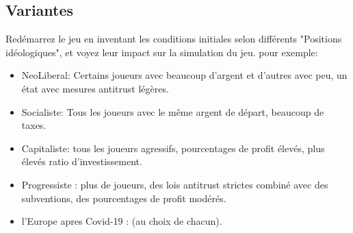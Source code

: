 \documentclass[12pt]{article}
\begin{document}
\subsection{Variantes}
Redémarrez le jeu en inventant les conditions initiales selon différents
"Positions idéologiques", et voyez leur impact sur la simulation du jeu. pour
exemple:
\begin{itemize}
  \item NeoLiberal: Certains joueurs avec beaucoup d'argent et d'autres avec peu, un état avec
mesures antitrust légères.
  \item Socialiste: Tous les joueurs avec le même argent de départ, beaucoup de taxes.
  \item Capitaliste: tous les joueurs agressifs, pourcentages de profit élevés, plus élevés
ratio d'investissement.
  \item Progressiste : plus de joueurs, des lois antitrust strictes
combiné avec des subventions, des pourcentages de profit modérés.
  \item l'Europe apres Covid-19 : (au choix de chacun).
\end{itemize}
\end{document}
